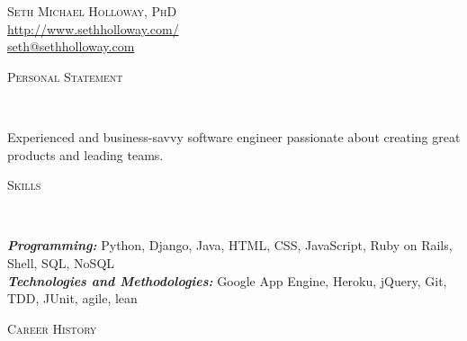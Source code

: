 \documentclass[9pt]{article}
\newenvironment{changemargin}[2]{%
  \begin{list}{}{%
    \setlength{\topsep}{0pt}%
    \setlength{\leftmargin}{#1}%
    \setlength{\rightmargin}{#2}%
    \setlength{\listparindent}{\parindent}%
    \setlength{\itemindent}{\parindent}%
    \setlength{\parsep}{\parskip}%
  }%
  \item[]}{\end{list}
}
\newcommand{\lineover}{
	\begin{changemargin}{-0.05in}{-0.05in}
		\vspace*{-8pt}
		\hrulefill \\
		\vspace*{-2pt}
	\end{changemargin}
}
\newcommand{\header}[1]{
	\begin{changemargin}{-0.5in}{-0.5in}
		\scshape{#1}\\
  	\lineover
	\end{changemargin}
}
\newcommand{\contact}[3]{
	\begin{changemargin}{-0.5in}{-0.5in}
		\begin{center}
			{\Large \scshape {#1}}\\ \smallskip
      {\url{#2}}\\ \smallskip
			{\url{#3}}\\
		\end{center}
	\end{changemargin}
}
\newenvironment{body} {
	\vspace*{-16pt}
	\begin{changemargin}{-0.25in}{-0.5in}
  }	
	{\end{changemargin}
}
\begin{document}
\contact{Seth Michael Holloway, PhD}{http://www.sethholloway.com/}{seth@sethholloway.com}


\header{Personal Statement}

\begin{body}
	\vspace{14pt}
  Experienced and business-savvy software engineer passionate about creating great products and leading teams.
\end{body}

\medskip


\header{Skills}

\begin{body}
	\vspace{14pt}
	\emph{\textbf{Programming:}}{} Python, Django, Java, HTML, CSS, JavaScript, Ruby on Rails, Shell, SQL, NoSQL\\
	\medskip
	\emph{\textbf{Technologies and Methodologies:}}{} Google App Engine, Heroku, jQuery, Git, TDD, JUnit, agile, lean\\
\end{body}

\medskip


\header{Career History}
\end{document}
